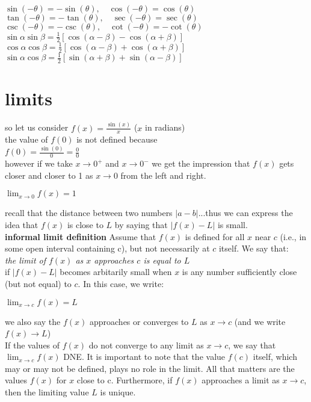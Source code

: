 \documentclass{article}
\begin{document}
$\sin(-\theta) = -\sin(\theta), \quad \cos(-\theta) = \cos(\theta) $\\
$\tan(-\theta) = -\tan(\theta), \quad \sec(-\theta) = \sec(\theta) $\\
$\csc(-\theta) = -\csc(\theta), \quad \cot(-\theta) = -\cot(\theta) $\\
$\sin \alpha \sin \beta = \frac{1}{2} [\cos(\alpha - \beta) - \cos(\alpha + \beta)] $\\
$\cos \alpha \cos \beta = \frac{1}{2} [\cos(\alpha - \beta) + \cos(\alpha + \beta)] $\\
$\sin \alpha \cos \beta = \frac{1}{2} [\sin(\alpha + \beta) + \sin(\alpha - \beta)] $\\



\section*{limits}
	so let us consider $f(x) = \frac{\sin(x)}{x}$ ($x$ in radians)\\
	the value of $f(0)$ is not defined because\\
	$f(0) = \frac{\sin(0)}{0} = \frac{0}{0}$\\
	however if we take $x \to 0^{+}$ and $x \to 0^{-}$ we get the impression that $f(x)$ gets closer and closer to 1 as $x \to 0$ from the left and right.
	\begin{center}
		$\lim_{x \to 0}f(x) = 1$
	\end{center}
	recall that the distance between two numbers $\lvert a - b\rvert$...thus we can express the idea that $f(x)$ is close to $L$ by saying that $\lvert f(x) - L\rvert$ is small.\\

	\textbf{informal limit definition} Assume that $f(x)$ is defined for all $x$ near $c$ (i.e., in some open interval containing c), but not necessarily at $c$ itself. We say that:\\
	\textit{the limit of $f(x)$ as $x$ approaches $c$ is equal to $L$}\\
	if $\lvert f(x) - L\rvert$ becomes arbitarily small when $x$ is any number sufficiently close (but not equal) to $c$. In this case, we write:
	\begin{center}
		$\lim_{x \to c}f(x) = L$
	\end{center}
	we also say the $f(x)$ approaches or converges to $L$ as $x \to c$ (and we write $f(x) \to L$)\\

	If the values of $f(x)$ do not converge to any limit as $x \to c$, we say that $\lim_{x \to c}f(x)$ DNE. It is important to note that the value $f(c)$ itself, which may or may not be defined, plays no role in the limit. All that matters are the values $f(x)$ for $x$ close to c. Furthermore, if $f(x)$ approaches a limit as $x \to c$, then the limiting value $L$ is unique.\\
\end{document}

